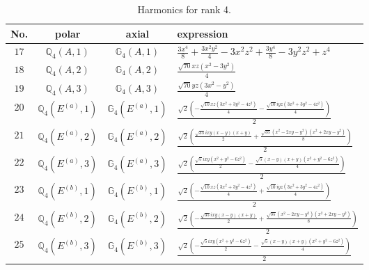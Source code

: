\documentclass[fleqn,8pt,landscape]{jsarticle}
\begin{document}
\begin{table}[ht!]
\begin{center}
\caption{Harmonics for rank 4.}
\renewcommand{\arraystretch}{1.3}
\begin{tabular}{cccl} \hline \hline
No. & polar & axial & expression \\ \hline
$ 17 $ & $ \mathbb{Q}_{4}(A,1) $ & $ \mathbb{G}_{4}(A,1) $ & $ \frac{3 x^{4}}{8} + \frac{3 x^{2} y^{2}}{4} - 3 x^{2} z^{2} + \frac{3 y^{4}}{8} - 3 y^{2} z^{2} + z^{4} $ \\
$ 18 $ & $ \mathbb{Q}_{4}(A,2) $ & $ \mathbb{G}_{4}(A,2) $ & $ \frac{\sqrt{70} x z \left(x^{2} - 3 y^{2}\right)}{4} $ \\
$ 19 $ & $ \mathbb{Q}_{4}(A,3) $ & $ \mathbb{G}_{4}(A,3) $ & $ \frac{\sqrt{70} y z \left(3 x^{2} - y^{2}\right)}{4} $ \\
$ 20 $ & $ \mathbb{Q}_{4}(E^{(a)},1) $ & $ \mathbb{G}_{4}(E^{(a)},1) $ & $ \frac{\sqrt{2} \left(- \frac{\sqrt{10} x z \left(3 x^{2} + 3 y^{2} - 4 z^{2}\right)}{4} - \frac{\sqrt{10} i y z \left(3 x^{2} + 3 y^{2} - 4 z^{2}\right)}{4}\right)}{2} $ \\
$ 21 $ & $ \mathbb{Q}_{4}(E^{(a)},2) $ & $ \mathbb{G}_{4}(E^{(a)},2) $ & $ \frac{\sqrt{2} \left(\frac{\sqrt{35} i x y \left(x - y\right) \left(x + y\right)}{2} + \frac{\sqrt{35} \left(x^{2} - 2 x y - y^{2}\right) \left(x^{2} + 2 x y - y^{2}\right)}{8}\right)}{2} $ \\
$ 22 $ & $ \mathbb{Q}_{4}(E^{(a)},3) $ & $ \mathbb{G}_{4}(E^{(a)},3) $ & $ \frac{\sqrt{2} \left(\frac{\sqrt{5} i x y \left(x^{2} + y^{2} - 6 z^{2}\right)}{2} - \frac{\sqrt{5} \left(x - y\right) \left(x + y\right) \left(x^{2} + y^{2} - 6 z^{2}\right)}{4}\right)}{2} $ \\
$ 23 $ & $ \mathbb{Q}_{4}(E^{(b)},1) $ & $ \mathbb{G}_{4}(E^{(b)},1) $ & $ \frac{\sqrt{2} \left(- \frac{\sqrt{10} x z \left(3 x^{2} + 3 y^{2} - 4 z^{2}\right)}{4} + \frac{\sqrt{10} i y z \left(3 x^{2} + 3 y^{2} - 4 z^{2}\right)}{4}\right)}{2} $ \\
$ 24 $ & $ \mathbb{Q}_{4}(E^{(b)},2) $ & $ \mathbb{G}_{4}(E^{(b)},2) $ & $ \frac{\sqrt{2} \left(- \frac{\sqrt{35} i x y \left(x - y\right) \left(x + y\right)}{2} + \frac{\sqrt{35} \left(x^{2} - 2 x y - y^{2}\right) \left(x^{2} + 2 x y - y^{2}\right)}{8}\right)}{2} $ \\
$ 25 $ & $ \mathbb{Q}_{4}(E^{(b)},3) $ & $ \mathbb{G}_{4}(E^{(b)},3) $ & $ \frac{\sqrt{2} \left(- \frac{\sqrt{5} i x y \left(x^{2} + y^{2} - 6 z^{2}\right)}{2} - \frac{\sqrt{5} \left(x - y\right) \left(x + y\right) \left(x^{2} + y^{2} - 6 z^{2}\right)}{4}\right)}{2} $ \\
 \hline \hline
\end{tabular}
\end{center}
\end{table}
\end{document}
